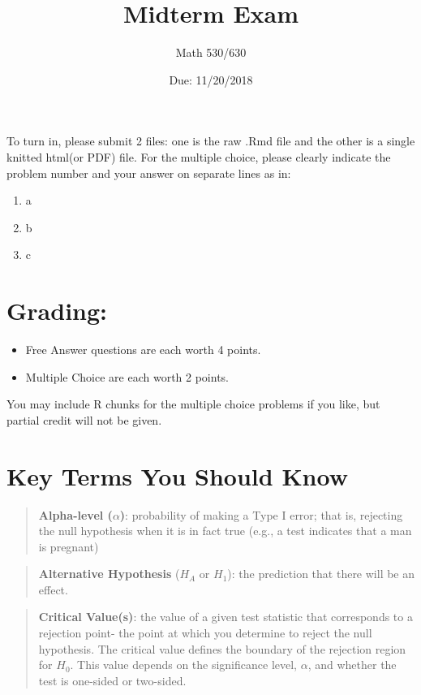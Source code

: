 \documentclass[]{article}
\title{Midterm Exam}
\subtitle{Math 530/630}
\author{}
\date{Due: 11/20/2018}
\providecommand{\tightlist}{%
  \setlength{\itemsep}{0pt}\setlength{\parskip}{0pt}}
\begin{document}
\maketitle

To turn in, please submit 2 files: one is the raw .Rmd file and the
other is a single knitted html(or PDF) file. For the multiple choice,
please clearly indicate the problem number and your answer on separate
lines as in:

\begin{enumerate}
\def\labelenumi{\arabic{enumi}.}
\tightlist
\item
  a
\item
  b
\item
  c
\end{enumerate}

\section{Grading:}\label{grading}

\begin{itemize}
\tightlist
\item
  Free Answer questions are each worth 4 points.
\item
  Multiple Choice are each worth 2 points.
\end{itemize}

You may include R chunks for the multiple choice problems if you like,
but partial credit will not be given.

\section{Key Terms You Should Know}\label{key-terms-you-should-know}

\begin{quote}
\textbf{Alpha-level (\(\alpha\))}: probability of making a Type I error;
that is, rejecting the null hypothesis when it is in fact true (e.g., a
test indicates that a man is pregnant)
\end{quote}

\begin{quote}
\textbf{Alternative Hypothesis} (\(H_A\) or \(H_1\)): the prediction
that there will be an effect.
\end{quote}

\begin{quote}
\textbf{Critical Value(s)}: the value of a given test statistic that
corresponds to a rejection point- the point at which you determine to
reject the null hypothesis. The critical value defines the boundary of
the rejection region for \(H_0\). This value depends on the significance
level, \(\alpha\), and whether the test is one-sided or two-sided.
\end{quote}
\end{document}
